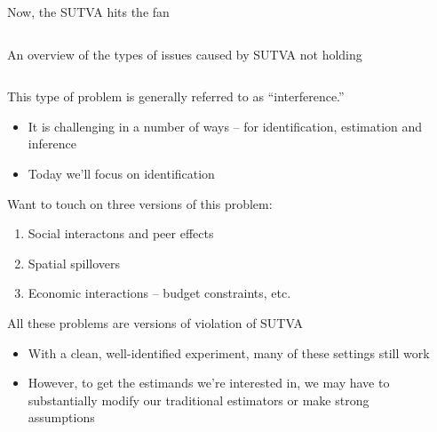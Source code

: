 \documentclass[notes,11pt, aspectratio=169]{beamer}
\newenvironment{wideitemize}{\itemize\addtolength{\itemsep}{10pt}}{\enditemize}
\begin{document}
\begin{frame}{Now, the SUTVA hits the fan}
\begin{columns}[T]
\begin{column}{.3\textwidth}
\begin{center}
{}
    \end{center}
  \end{column}
\end{columns}
\end{frame}


\begin{frame}{An overview of the types of issues caused by SUTVA not holding}
  \begin{columns}[T] %
    \begin{column}{.7\textwidth}
      \begin{wideitemize}
      \item This type of problem is generally referred to as ``interference.''
        \begin{itemize}
        \item It is challenging in a number of ways -- for identification, estimation and inference
        \item Today we'll focus on identification
        \end{itemize}
      \item Want to touch on three versions of this problem:        
        \begin{enumerate}
        \item Social interactons and peer effects
        \item Spatial spillovers
        \item Economic interactions -- budget constraints, etc.
        \end{enumerate}
      \item All these problems are versions of violation of SUTVA
        \begin{itemize}
        \item With a clean, well-identified experiment, many of these
          settings still work
        \item However, to get the estimands we're interested in, we
          may have to substantially modify our traditional estimators or make strong assumptions
        \end{itemize}
      \end{wideitemize}
  \end{column}%
  \hfill%
  \begin{column}{.5\textwidth}
    \begin{center}
    \end{center}
  \end{column}
\end{columns}

\end{frame}
\end{document}
